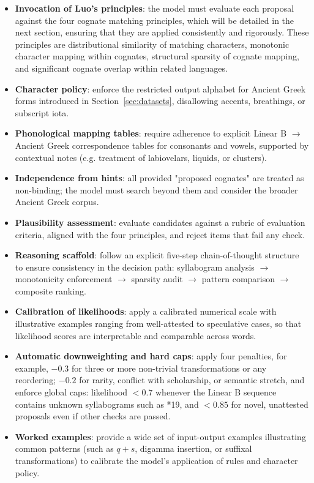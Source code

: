 \begin{itemize}[leftmargin=2em]
  \item \textbf{Invocation of Luo's principles}: the model must evaluate each proposal against the four cognate matching principles, which will be detailed in the next section, ensuring that they are applied consistently and rigorously.
  These principles are distributional similarity of matching characters, monotonic character mapping within cognates, structural sparsity of cognate mapping, and significant cognate overlap within related languages.
  \item \textbf{Character policy}: enforce the restricted output alphabet for Ancient Greek forms introduced in Section~\ref{sec:datasets}, disallowing accents, breathings, or subscript iota.
  \item \textbf{Phonological mapping tables}: require adherence to explicit Linear B $\rightarrow$ Ancient Greek correspondence tables for consonants and vowels, supported by contextual notes (e.g. treatment of labiovelars, liquids, or clusters).
  \item \textbf{Independence from hints}: all provided "proposed cognates" are treated as non-binding; the model must search beyond them and consider the broader Ancient Greek corpus.
  \item \textbf{Plausibility assessment}: evaluate candidates against a rubric of evaluation criteria, aligned with the four principles, and reject items that fail any check.
  \item \textbf{Reasoning scaffold}: follow an explicit five-step chain-of-thought structure to ensure consistency in the decision path: syllabogram analysis $\rightarrow$ monotonicity enforcement $\rightarrow$ sparsity audit $\rightarrow$ pattern comparison $\rightarrow$ composite ranking.
  \item \textbf{Calibration of likelihoods}: apply a calibrated numerical scale with illustrative examples ranging from well-attested to speculative cases, so that likelihood scores are interpretable and comparable across words.
  \item \textbf{Automatic downweighting and hard caps}: apply four penalties, for example, $-0.3$ for three or more non-trivial transformations or any reordering; $-0.2$ for rarity, conflict with scholarship, or semantic stretch, and enforce global caps: likelihood $<0.7$ whenever the Linear B sequence contains unknown syllabograms such as *19, and $<0.85$ for novel, unattested proposals even if other checks are passed.
  \item \textbf{Worked examples}: provide a wide set of input-output examples illustrating common patterns (such as $q{+}s$, digamma insertion, or suffixal transformations) to calibrate the model's application of rules and character policy.

\end{itemize}

